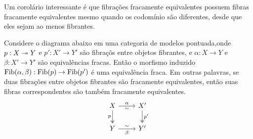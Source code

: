 Um corolário interessante é que fibrações fracamente equivalentes possuem fibras fracamente equivalentes mesmo quando os codomínio são diferentes, desde que eles sejam ao menos fibrantes.

\begin{corol}\label{corol:equivalencia_fibras_2}
  Considere o diagrama abaixo em uma categoria de modelos pontuada,onde $p: X \twoheadrightarrow Y$ e $p': X' \to Y'$ são fibraçõs entre objetos fibrantes, e $\alpha: X \to Y$ e $\beta: X' \to Y'$ são equivalências fracas.
  Então o morfismo induzido $\mathrm{Fib}(\alpha,\beta): \mathrm{Fib}(p) \to \mathrm{Fib}(p')$ é uma equivalência fraca.
  Em outras palavras, se duas fibrações entre objetos fibrantes são fracamente equivalentes, então suas fibras correspondentes são também fracamente equivalentes.
  \begin{displaymath}
    \begin{tikzcd}
      X
      \arrow[r, "\alpha", "\sim" {swap}]
      \arrow[d, two heads, "p" swap]
      & X'
      \arrow[d, two heads, "p'"]
      \\ Y
      \arrow[r, "\beta" {swap}, "\sim"]
      & Y'
    \end{tikzcd}
  \end{displaymath}
\end{corol}

